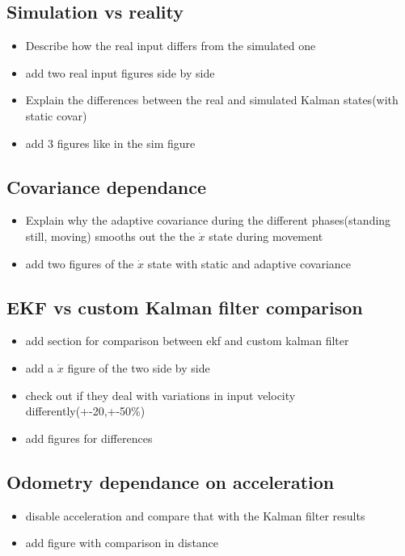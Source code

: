 \subsection{Simulation vs reality}\label{subsec:simvsreal}
\begin{itemize}
 \item Describe how the real input differs from the simulated one
 \item add two real input figures side by side
\end{itemize}
\hrulefill
\begin{itemize}
 \item Explain the differences between the real and simulated Kalman states(with static covar)
 \item add 3 figures like in the sim figure
\end{itemize}

\subsection{Covariance dependance}\label{subsec:covardep}
\begin{itemize}
 \item Explain why the adaptive covariance during the different phases(standing still, moving) smooths out the the $\dot{x}$ state during movement
 \item add two figures of the $\dot{x}$ state with static and adaptive covariance
\end{itemize}

\subsection{EKF vs custom Kalman filter comparison}\label{subsec:ekfvscustom}
\begin{itemize}
 \item add section for comparison between ekf and custom kalman filter
 \item add a $\dot{x}$ figure of the two side by side
 \item check out if they deal with variations in input velocity differently(+-20,+-50\%)
 \item add figures for differences
\end{itemize}

\subsection{Odometry dependance on acceleration}\label{subsec:odomdepaccel}
\begin{itemize}
 \item disable acceleration and compare that with the Kalman filter results
 \item add figure with comparison in distance
\end{itemize}

